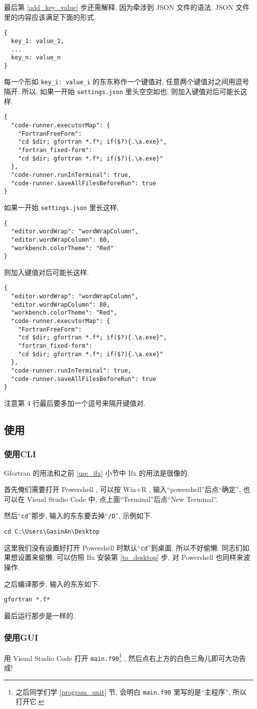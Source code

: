 最后第 \ref{add_key_value} 步还需解释, 因为牵涉到 JSON 文件的语法. JSON 文件里的内容应该满足下面的形式.
\begin{verbatim}
{
  key_1: value_1,
  ...
  key_n: value_n
}
\end{verbatim}
每一个形如 \texttt{key\_{}i: value\_{}i} 的东东称作一个键值对, 任意两个键值对之间用逗号隔开. 所以, 如果一开始 \texttt{settings.json} 里头空空如也, 则加入键值对后可能长这样.
\begin{verbatim}
{
  "code-runner.executorMap": {
    "FortranFreeForm":
    "cd $dir; gfortran *.f*; if($?){.\a.exe}",
    "fortran_fixed-form":
    "cd $dir; gfortran *.f*; if($?){.\a.exe}"
  },
  "code-runner.runInTerminal": true,
  "code-runner.saveAllFilesBeforeRun": true
}
\end{verbatim}
如果一开始 \texttt{settings.json} 里长这样,
\begin{lstlisting}
{
  "editor.wordWrap": "wordWrapColumn",
  "editor.wordWrapColumn": 80,
  "workbench.colorTheme": "Red"
}
\end{lstlisting}
则加入键值对后可能长这样.
\begin{lstlisting}
{
  "editor.wordWrap": "wordWrapColumn",
  "editor.wordWrapColumn": 80,
  "workbench.colorTheme": "Red",
  "code-runner.executorMap": {
    "FortranFreeForm":
    "cd $dir; gfortran *.f*; if($?){.\a.exe}",
    "fortran_fixed-form":
    "cd $dir; gfortran *.f*; if($?){.\a.exe}"
  },
  "code-runner.runInTerminal": true,
  "code-runner.saveAllFilesBeforeRun": true
}
\end{lstlisting}
注意第 4 行最后要多加一个逗号来隔开键值对.

\subsection{使用}\label{use_gfortran}

\subsubsection{使用CLI}

Gfortran 的用法和之前 \ref{use_ifx} 小节中 Ifx 的用法是很像的.

首先俺们需要打开 Powershell , 可以按 Win+R , 输入``powershell''后点``确定'', 也可以在 Visual Studio Code 中, 点上面``Terminal''后点``New Terminal''.

然后``\texttt{cd}''那步, 输入的东东要去掉``\texttt{/D}'', 示例如下.
\begin{verbatim}
cd C:\Users\GasinAn\Desktop
\end{verbatim}
这里我们没有设置好打开 Powershell 时默认``\texttt{cd}''到桌面, 所以不好偷懒. 同志们如果想设置来偷懒, 可以仿照 Ifx 安装第 \ref{to_desktop} 步, 对 Powershell 也同样来波操作.

之后编译那步, 输入的东东如下.
\begin{verbatim}
gfortran *.f*
\end{verbatim}

最后运行那步是一样的.

\subsubsection{使用GUI}

用 Visual Studio Code 打开 \texttt{main.f90}\footnote{之后同学们学 \ref{program_unit} 节, 会明白 \texttt{main.f90} 里写的是``主程序'', 所以打开它.} , 然后点右上方的白色三角儿即可大功告成!
